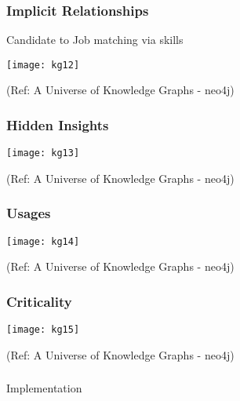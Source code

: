 \begin{frame}[fragile]\frametitle{Implicit Relationships}
 
	Candidate to Job matching via skills
 
			\begin{center}
			\texttt{[image: kg12]}
			\end{center}	
			
			{\tiny (Ref: A Universe of Knowledge Graphs - neo4j)}
		
	
\end{frame}

\begin{frame}[fragile]\frametitle{Hidden Insights}
 
 
			\begin{center}
			\texttt{[image: kg13]}
			\end{center}	
			
			{\tiny (Ref: A Universe of Knowledge Graphs - neo4j)}
		
	
\end{frame}

\begin{frame}[fragile]\frametitle{Usages}
 
 
			\begin{center}
			\texttt{[image: kg14]}
			\end{center}	
			
			{\tiny (Ref: A Universe of Knowledge Graphs - neo4j)}
		
	
\end{frame}

\begin{frame}[fragile]\frametitle{Criticality}
 
 
			\begin{center}
			\texttt{[image: kg15]}
			\end{center}	
			
			{\tiny (Ref: A Universe of Knowledge Graphs - neo4j)}
		
	
\end{frame}



\begin{frame}[fragile]\frametitle{}
\begin{center}
{\Large Implementation}
\end{center}
\end{frame}



